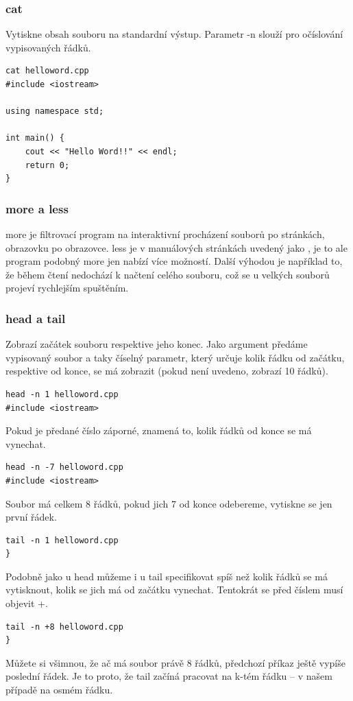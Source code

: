 \documentclass{article}
\begin{document}
\subsubsection{cat}
Vytiskne obsah souboru na standardní výstup. Parametr -n slouží pro očíslování vypisovaných řádků.
\begin{verbatim}
cat helloword.cpp
#include <iostream>

using namespace std;

int main() {
	cout << "Hello Word!!" << endl;	
	return 0;	
}
\end{verbatim}

\subsubsection{more a less}
more je filtrovací program na interaktivní procházení souborů po stránkách, obrazovku po obrazovce. less je v manuálových stránkách uvedený jako , je to ale program podobný more jen nabízí více možností. Další výhodou je například to, že během čtení nedochází k načtení celého souboru, což se u velkých souborů projeví rychlejším spuštěním.

\subsubsection{head a tail}
Zobrazí začátek souboru respektive jeho konec. Jako argument předáme vypisovaný soubor a taky číselný parametr, který určuje kolik řádku od začátku, respektive od konce, se má zobrazit (pokud není uvedeno, zobrazí 10 řádků).
\begin{verbatim}
head -n 1 helloword.cpp
#include <iostream>
\end{verbatim}
Pokud je předané číslo záporné, znamená to, kolik řádků od konce se má vynechat. 
\begin{verbatim}
head -n -7 helloword.cpp
#include <iostream>
\end{verbatim}
Soubor má celkem 8 řádků, pokud jich 7 od konce odebereme, vytiskne se jen první řádek. 
\begin{verbatim}
tail -n 1 helloword.cpp
}
\end{verbatim}
Podobně jako u head můžeme i u tail specifikovat spíš než kolik řádků se má vytisknout, kolik se jich má od začátku vynechat. Tentokrát se před číslem musí objevit +.

\begin{verbatim}
tail -n +8 helloword.cpp
}
\end{verbatim}
Můžete si všimnou, že ač má soubor právě 8 řádků, předchozí příkaz ještě vypíše poslední řádek. Je to proto, že tail začíná pracovat na k-tém řádku -- v našem případě na osmém řádku.
\end{document}
